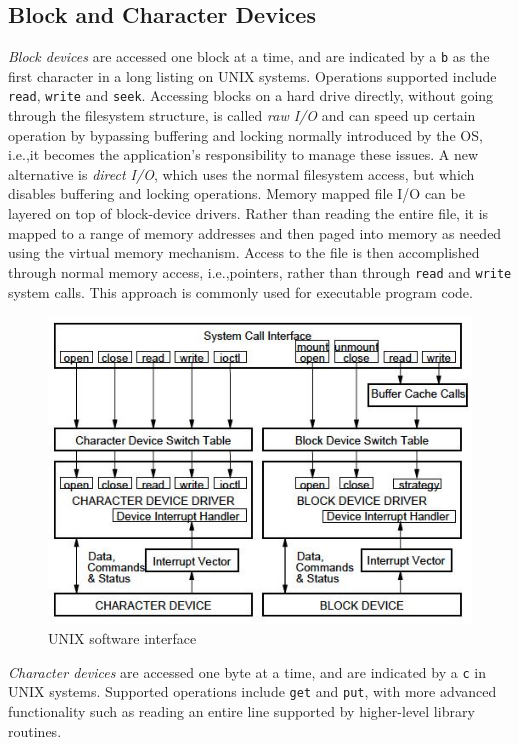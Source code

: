 \subsection{Block and Character Devices}
\emph{Block devices} are accessed one block at a time, and are indicated by a \texttt{b} as the first character in a long listing on UNIX systems. Operations supported include \texttt{read}, \texttt{write} and \texttt{seek}. Accessing blocks on a hard drive directly, without going through the filesystem structure, is called \emph{raw I/O} and can speed up certain operation by bypassing buffering and locking normally introduced by the OS, i.e.,\@ it becomes the application's responsibility to manage these issues. A new alternative is \emph{direct I/O}, which uses the normal filesystem access, but which disables buffering and locking operations. Memory mapped file I/O can be layered on top of block-device drivers. Rather than reading the entire file, it is mapped to a range of memory addresses and then paged into memory as needed using the virtual memory mechanism. Access to the file is then accomplished through normal memory access, i.e.,\@ pointers, rather than through \texttt{read} and \texttt{write} system calls. This approach is commonly used for executable program code.

\begin{figure}[hbtp]
\centering
\includegraphics[scale=0.4]{images/device_management/unix_sw_interface.jpg}
\caption{UNIX software interface}
\end{figure}

\emph{Character devices} are accessed one byte at a time, and are indicated by a \texttt{c} in UNIX systems. Supported operations include \texttt{get} and \texttt{put}, with more advanced functionality such as reading an entire line supported by higher-level library routines.

